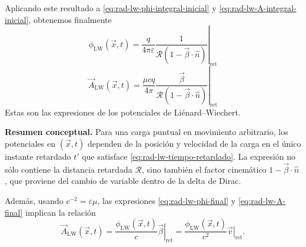 \documentclass[12pt,a4paper]{article}
\theoremstyle{definition}
\theoremstyle{plain}
\numberwithin{equation}{section}
\theoremstyle{remark}
\begin{document}
Aplicando este resultado a \eqref{eq:rad-lw-phi-integral-inicial} y \eqref{eq:rad-lw-A-integral-inicial}, obtenemos finalmente
\begin{equation}
    \boxed{
    \phi_{\mathrm{LW}}(\vec x,t)=
    \frac{q}{4\pi\varepsilon}
    \left.\frac{1}{\mathcal R(1-\vec\beta\cdot\hat n)}\right|_{\mathrm{ret}}
    }
    \label{eq:rad-lw-phi-final}
\end{equation}
\begin{equation}
    \boxed{
    \vec A_{\mathrm{LW}}(\vec x,t)=
    \frac{\mu c q}{4\pi}
    \left.\frac{\vec\beta}{\mathcal R(1-\vec\beta\cdot\hat n)}\right|_{\mathrm{ret}}
    }
    \label{eq:rad-lw-A-final}
\end{equation}
Estas son las expresiones de los potenciales de Liénard--Wiechert.

\begin{cajaidea}
\textbf{Resumen conceptual.} Para una carga puntual en movimiento arbitrario, los potenciales en $(\vec x,t)$ dependen de la posición y velocidad de la carga en el único instante retardado $t'$ que satisface \eqref{eq:rad-lw-tiempo-retardado}. La expresión no sólo contiene la distancia retardada $\mathcal R$, sino también el factor cinemático $1-\vec\beta\cdot\hat n$, que proviene del cambio de variable dentro de la delta de Dirac.
\end{cajaidea}

Además, usando $c^{-2}=\varepsilon\mu$, las expresiones \eqref{eq:rad-lw-phi-final} y \eqref{eq:rad-lw-A-final} implican la relación
\begin{equation}
    \boxed{
    \vec A_{\mathrm{LW}}(\vec x,t)=
    \frac{\phi_{\mathrm{LW}}(\vec x,t)}{c}\left.\vec\beta\right|_{\mathrm{ret}}
    =\frac{\phi_{\mathrm{LW}}(\vec x,t)}{c^2}\left.\vec v\right|_{\mathrm{ret}}.
    }
    \label{eq:rad-lw-relacion-A-phi}
\end{equation}
\end{document}

